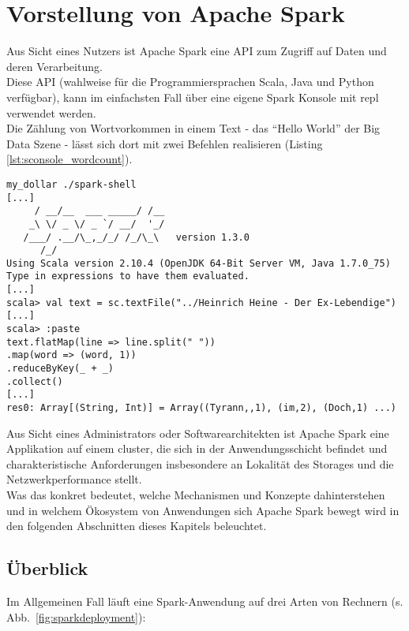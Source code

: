 \chapter{Vorstellung von Apache Spark}
Aus Sicht eines Nutzers ist Apache Spark eine API zum Zugriff auf Daten und deren Verarbeitung.\\

Diese API (wahlweise für die Programmiersprachen Scala, Java und Python verfügbar), kann im einfachsten Fall über eine eigene Spark Konsole mit \gls{repl}\cite{Hail} verwendet werden.\\
Die Zählung von Wortvorkommen in einem Text - das "`Hello World"' der Big Data Szene - lässt sich dort mit zwei Befehlen realisieren (Listing \ref{lst:sconsole_wordcount}).\\

\begin{lstlisting}[caption={Word Count in der Spark Konsole},label={lst:sconsole_wordcount}]
my_dollar ./spark-shell
[...]
     / __/__  ___ _____/ /__
    _\ \/ _ \/ _ `/ __/  '_/
   /___/ .__/\_,_/_/ /_/\_\   version 1.3.0
      /_/
Using Scala version 2.10.4 (OpenJDK 64-Bit Server VM, Java 1.7.0_75)
Type in expressions to have them evaluated.
[...]
scala> val text = sc.textFile("../Heinrich Heine - Der Ex-Lebendige")
[...]
scala> :paste
text.flatMap(line => line.split(" "))
.map(word => (word, 1))
.reduceByKey(_ + _)
.collect()
[...]
res0: Array[(String, Int)] = Array((Tyrann,,1), (im,2), (Doch,1) ...)
\end{lstlisting}


Aus Sicht eines Administrators oder Softwarearchitekten ist Apache Spark eine Applikation auf einem \gls{cluster}, die sich in der Anwendungsschicht befindet und charakteristische Anforderungen insbesondere an Lokalität des Storages und die Netzwerkperformance stellt.\\

Was das konkret bedeutet, welche Mechanismen und Konzepte dahinterstehen und in welchem Ökosystem von Anwendungen sich Apache Spark bewegt wird in den folgenden Abschnitten dieses Kapitels beleuchtet.

\section{Überblick}
Im Allgemeinen Fall läuft eine Spark-Anwendung auf drei Arten von Rechnern (s. Abb.~\ref{fig:sparkdeployment}):

